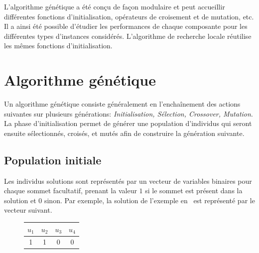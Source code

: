 \documentclass[10pt]{article}
\begin{document}
	L'algorithme génétique a été conçu de façon modulaire et peut accueillir différentes fonctions d'initialisation, opérateurs de croisement et de mutation, etc. Il a ainsi été possible d'étudier les performances de chaque composante pour les différentes types d'instances considérés. L'algorithme de recherche locale réutilise les mêmes fonctions d'initialisation.
	
\section{Algorithme génétique}
	Un algorithme génétique consiste généralement en l'enchaînement des actions suivantes sur plusieurs générations: \textit{Initialisation, Sélection, Crossover, Mutation}. La phase d'initialisation permet de générer une population d'individus qui seront ensuite sélectionnés, croisés, et mutés afin de construire la génération suivante.

	\subsection{Population initiale}
		Les individus solutions sont représentés par un vecteur de variables binaires pour chaque sommet facultatif, prenant la valeur $1$ si le sommet est présent dans la solution et 0 sinon. Par exemple, la solution de l'exemple en~ est représenté par le vecteur suivant.
		\begin{figure}[h!]
			\centering
			\begin{tabular}{|c|c|c|c|}
				\hline
				$u_1$ & $u_2$ & $u_3$ & $u_4$ \\
				\hline
				1 & 1 & 0 & 0 \\
				\hline
			\end{tabular}
		\end{figure}
	
\end{document}
